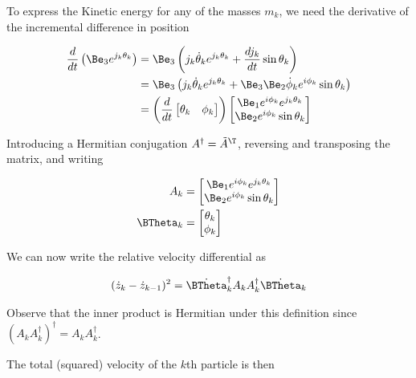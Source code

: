 To express the Kinetic energy for any of the masses $m_k$, we need the derivative of the incremental difference in position

\begin{align*}
\frac{d}{dt} \left( \Be_3 e^{j_k \theta_k} \right)
&=
\Be_3 \left( j_k \dot{\theta}_k e^{j_k \theta_k} + \frac{d j_k }{dt} \sin\theta_k \right)  \\
&=
\Be_3 \left( j_k \dot{\theta}_k e^{j_k \theta_k} + \Be_3 \Be_2 \dot{\phi}_k e^{i \phi_k} \sin\theta_k \right)  \\
&=
\left( \frac{d}{dt}
\begin{bmatrix}
\theta_k & \phi_k
\end{bmatrix} \right)
\begin{bmatrix}
\Be_1 e^{i \phi_k} e^{j_k \theta_k} \\
\Be_2 e^{i \phi_k} \sin\theta_k
\end{bmatrix}
\end{align*}

Introducing a Hermitian conjugation $A^\dagger = \tilde{A}^\T$, reversing and transposing the matrix, and writing

\begin{align}\label{eqn:multiPendulumSpherical2:boo2}
A_k &=
\begin{bmatrix}
\Be_1 e^{i \phi_k} e^{j_k \theta_k} \\
\Be_2 e^{i \phi_k} \sin\theta_k
\end{bmatrix} \\
\BTheta_k &=
\begin{bmatrix}
\theta_k \\
\phi_k
\end{bmatrix}
\end{align}

We can now write the relative velocity differential as

\begin{align}\label{eqn:multiPendulumSpherical2:boo3}
(\dot{z}_k - \dot{z}_{k-1})^2 = {\dot{\BTheta}_k}^\dagger A_k A_k^\dagger \dot{\BTheta}_k
\end{align}

Observe that the inner product is Hermitian under this definition since $(A_k A_k^\dagger)^\dagger = A_k A_k^\dagger$.

The total (squared) velocity of the $k$th particle is then

